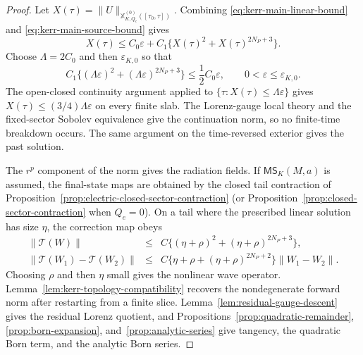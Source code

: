 \documentclass[11pt]{article}
\numberwithin{equation}{section}
\theoremstyle{plain}
\theoremstyle{definition}
\theoremstyle{remark}
\newcommand{\MScat}{\mathsf{MS}}
\begin{document}
\begin{proof}
Let \(X(\tau)=\|U\|_{\mathbb X_{K,Q_e}^{(0)}([\tau_0,\tau])}\).  Combining \eqref{eq:kerr-main-linear-bound} and \eqref{eq:kerr-main-source-bound} gives
\begin{equation}\label{eq:kerr-main-bootstrap}
 X(\tau)\le C_0\varepsilon+C_1\{X(\tau)^2+X(\tau)^{2N_P+3}\}.
\end{equation}
Choose \(\Lambda=2C_0\) and then \(\varepsilon_{K,0}\) so that
\begin{equation}\label{eq:kerr-main-smallness}
 C_1\{(\Lambda\varepsilon)^2+(\Lambda\varepsilon)^{2N_P+3}\}
 \le \frac12 C_0\varepsilon,
 \qquad 0<\varepsilon\le\varepsilon_{K,0}.
\end{equation}
The open-closed continuity argument applied to \(\{\tau:X(\tau)\le\Lambda\varepsilon\}\) gives \(X(\tau)\le(3/4)\Lambda\varepsilon\) on every finite slab.  The Lorenz-gauge local theory and the fixed-sector Sobolev equivalence give the continuation norm, so no finite-time breakdown occurs.  The same argument on the time-reversed exterior gives the past solution.

The \(r^p\) component of the norm gives the radiation fields.  If \(\MScat_K(M,a)\) is assumed, the final-state maps are obtained by the closed tail contraction of Proposition~\ref{prop:electric-closed-sector-contraction} (or Proposition~\ref{prop:closed-sector-contraction} when \(Q_e=0\)).  On a tail where the prescribed linear solution has size \(\eta\), the correction map obeys
\begin{eqnarray}
 \|\mathcal T(W)\|&\le& C\{(\eta+\rho)^2+(\eta+\rho)^{2N_P+3}\},\nonumber\\
 \|\mathcal T(W_1)-\mathcal T(W_2)\|
 &\le& C\{\eta+\rho+(\eta+\rho)^{2N_P+2}\}\|W_1-W_2\|.
 \label{eq:kerr-main-tail-contraction}
\end{eqnarray}
Choosing \(\rho\) and then \(\eta\) small gives the nonlinear wave operator.  Lemma~\ref{lem:kerr-topology-compatibility} recovers the nondegenerate forward norm after restarting from a finite slice.  Lemma~\ref{lem:residual-gauge-descent} gives the residual Lorenz quotient, and Propositions~\ref{prop:quadratic-remainder}, \ref{prop:born-expansion}, and~\ref{prop:analytic-series} give tangency, the quadratic Born term, and the analytic Born series.
\end{proof}
\end{document}
